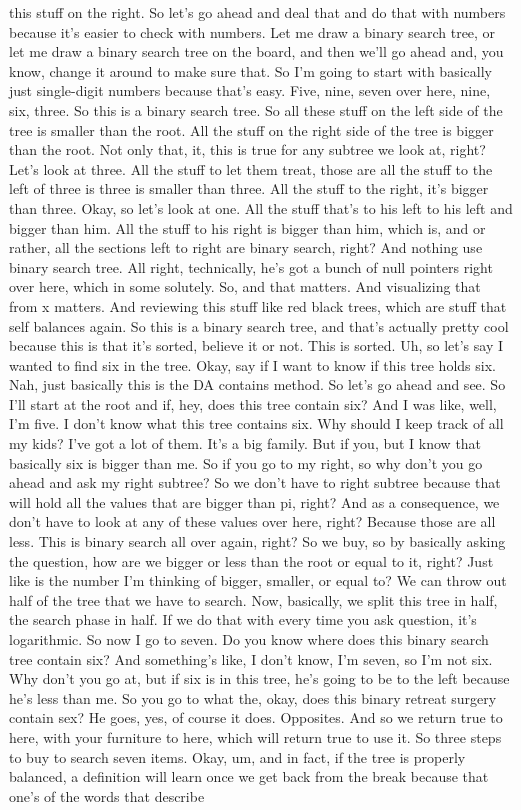 this stuff on the right. So let's go ahead and deal that and do that with numbers because it's easier to check with numbers. Let me draw a binary search tree, or let me draw a binary search tree on the board, and then we'll go ahead and, you know, change it around to make sure that. So I'm going to start with basically just single-digit numbers because that's easy. Five, nine, seven over here, nine, six, three. So this is a binary search tree. So all these stuff on the left side of the tree is smaller than the root. All the stuff on the right side of the tree is bigger than the root. Not only that, it, this is true for any subtree we look at, right? Let's look at three. All the stuff to let them treat, those are all the stuff to the left of three is three is smaller than three. All the stuff to the right, it's bigger than three. Okay, so let's look at one. All the stuff that's to his left to his left and bigger than him. All the stuff to his right is bigger than him, which is, and or rather, all the sections left to right are binary search, right? And nothing use binary search tree. All right, technically, he's got a bunch of null pointers right over here, which in some solutely. So, and that matters. And visualizing that from x matters. And reviewing this stuff like red black trees, which are stuff that self balances again. So this is a binary search tree, and that's actually pretty cool because this is that it's sorted, believe it or not. This is sorted. Uh, so let's say I wanted to find six in the tree. Okay, say if I want to know if this tree holds six. Nah, just basically this is the DA contains method. So let's go ahead and see. So I'll start at the root and if, hey, does this tree contain six? And I was like, well, I'm five. I don't know what this tree contains six. Why should I keep track of all my kids? I've got a lot of them. It's a big family. But if you, but I know that basically six is bigger than me. So if you go to my right, so why don't you go ahead and ask my right subtree? So we don't have to right subtree because that will hold all the values that are bigger than pi, right? And as a consequence, we don't have to look at any of these values over here, right? Because those are all less. This is binary search all over again, right? So we buy, so by basically asking the question, how are we bigger or less than the root or equal to it, right? Just like is the number I'm thinking of bigger, smaller, or equal to? We can throw out half of the tree that we have to search. Now, basically, we split this tree in half, the search phase in half. If we do that with every time you ask question, it's logarithmic. So now I go to seven. Do you know where does this binary search tree contain six? And something's like, I don't know, I'm seven, so I'm not six. Why don't you go at, but if six is in this tree, he's going to be to the left because he's less than me. So you go to what the, okay, does this binary retreat surgery contain sex? He goes, yes, of course it does. Opposites. And so we return true to here, with your furniture to here, which will return true to use it. So three steps to buy to search seven items. Okay, um, and in fact, if the tree is properly balanced, a definition will learn once we get back from the break because that one's of the words that describe 